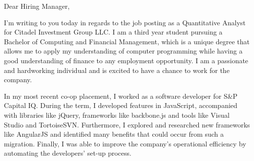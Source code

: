\documentclass[letterpaper]{deedy-resume} %
\begin{document}
\iffalse
{}

\vspace{8mm}

\begingroup
{\fontsize{14pt}{16pt}\selectfont
\begin {flushleft}
Dear Hiring Manager,\\
\end {flushleft}

\begin {flushleft}
 I’m writing to you today in regards to the job posting as a Quantitative Analyst for Citadel Investment Group LLC. I am a third year student pursuing a Bachelor of Computing and Financial Management, which is a unique degree that allows me to apply my understanding of computer programming while having a good understanding of finance to any employment opportunity. I am a passionate and hardworking individual and is excited to have a chance to work for the company. 
\end {flushleft}

\begin {flushleft}
In my most recent co-op placement, I worked as a software developer for S\&P Capital IQ. During the term, I developed features in JavaScript, accompanied with libraries like jQuery, frameworks like backbone.js and tools like Visual Studio and TortoiseSVN. Furthermore, I explored and researched new frameworks like AngularJS and identified many benefits that could occur from such a migration. Finally, I was able to improve the company's operational efficiency by automating the developers' set-up process. 
\end {flushleft}


\iffalse
\begin {flushleft}
Aside from web developement languages, I also developed skills in C++ and Python through my independent and academic studies. My interest in computer programmming is motivating me to learn new technologies including mobile developement. With a solid foundation on programming design as well as a passion for innovation, I am always ready to take on new and challenging problems. \\
\end {flushleft}
\fi

}
\end{document}
